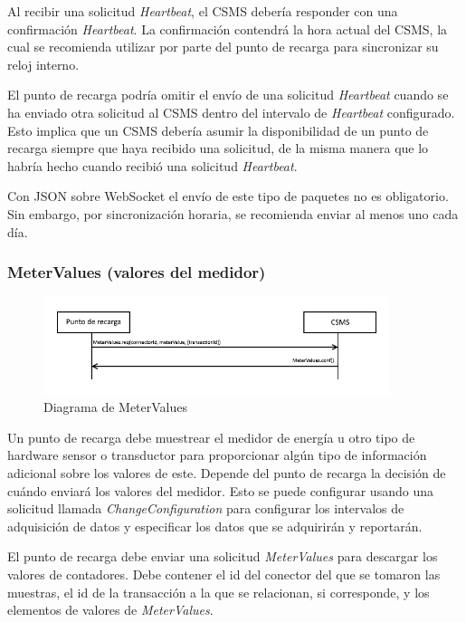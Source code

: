 \documentclass[12pt,a4paper,onecolumn,oneside]{report}
\begin{document}
Al recibir una solicitud \textit{Heartbeat}, el CSMS debería responder con una confirmación \textit{Heartbeat}. La confirmación contendrá la hora actual del CSMS, la cual se recomienda utilizar por parte del punto de recarga para sincronizar su reloj interno.

El punto de recarga podría omitir el envío de una solicitud \textit{Heartbeat} cuando se ha enviado otra solicitud al CSMS dentro del intervalo de \textit{Heartbeat} configurado. Esto implica que un CSMS debería asumir la disponibilidad de un punto de recarga siempre que haya recibido una solicitud, de la misma manera que lo habría hecho cuando recibió una solicitud \textit{Heartbeat}.

Con JSON sobre WebSocket el envío de este tipo de paquetes no es obligatorio. Sin embargo, por sincronización horaria, se recomienda enviar al menos uno cada día.


\subsubsection{MeterValues (valores del medidor)}
\label{MeterValues (valores del medidor)}


\begin{figure}[H] 
\centering
  \includegraphics[width=0.9\textwidth]{figuras/diagramametervalues.png}
  \caption[Diagrama de \textit{MeterValues}]{Diagrama de MeterValues\\
  }
  \label{fig:diagramametervalues}
\end{figure}


Un punto de recarga debe muestrear el medidor de energía u otro tipo de hardware sensor o transductor para proporcionar algún tipo de información adicional sobre los valores de este. Depende del punto de recarga la decisión de cuándo enviará los valores del medidor. Esto se puede configurar usando una solicitud llamada \textit{ChangeConfiguration} para configurar los intervalos de adquisición de datos y especificar los datos que se adquirirán y reportarán.

El punto de recarga debe enviar una solicitud \textit{MeterValues} para descargar los valores de contadores. Debe contener el id del conector del que se tomaron las muestras, el id de la transacción a la que se relacionan, si corresponde, y los elementos de valores de \textit{MeterValues}.
\end{document}
